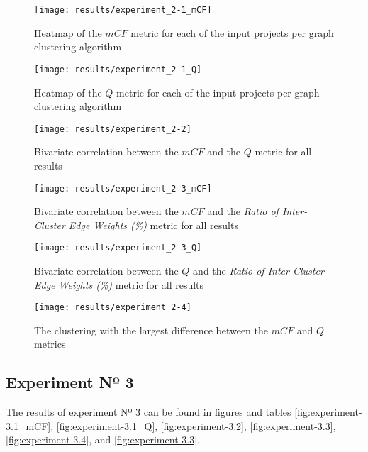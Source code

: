 \documentclass[12pt,a4paper]{report}
\begin{document}
\begin{figure}[htbp]
\centering
\texttt{[image: results/experiment\_2-1\_mCF]}
\caption{Heatmap of the $mCF$ metric for each of the input projects per graph clustering algorithm}
\label{fig:experiment-2.1_mCF}
\end{figure}

\begin{figure}[htbp]
\centering
\texttt{[image: results/experiment\_2-1\_Q]}
\caption{Heatmap of the $Q$ metric for each of the input projects per graph clustering algorithm}
\label{fig:experiment-2.1_Q}
\end{figure}

\begin{figure}[htbp]
\centering
\texttt{[image: results/experiment\_2-2]}
\caption{Bivariate correlation between the $mCF$ and the $Q$ metric for all results}
\label{fig:experiment-2.2}
\end{figure}

\begin{figure}[htbp]
\centering
\texttt{[image: results/experiment\_2-3\_mCF]}
\caption{Bivariate correlation between the $mCF$ and the \textit{Ratio of Inter-Cluster Edge Weights (\%)} metric for all results}
\label{fig:experiment-2.3_mCF}
\end{figure}

\begin{figure}[htbp]
\centering
\texttt{[image: results/experiment\_2-3\_Q]}
\caption{Bivariate correlation between the $Q$ and the \textit{Ratio of Inter-Cluster Edge Weights (\%)} metric for all results}
\label{fig:experiment-2.3_Q}
\end{figure}

\begin{figure}[htbp]
\centering
\texttt{[image: results/experiment\_2-4]}
\caption{The clustering with the largest difference between the $mCF$ and $Q$ metrics}
\label{fig:experiment-2.4}
\end{figure}


\subsection{Experiment Nº 3}

The results of experiment Nº 3 can be found in figures and tables
\ref{fig:experiment-3.1_mCF}, \ref{fig:experiment-3.1_Q}, \ref{fig:experiment-3.2},
\ref{fig:experiment-3.3}, \ref{fig:experiment-3.4}, and \ref{fig:experiment-3.3}.
\end{document}
